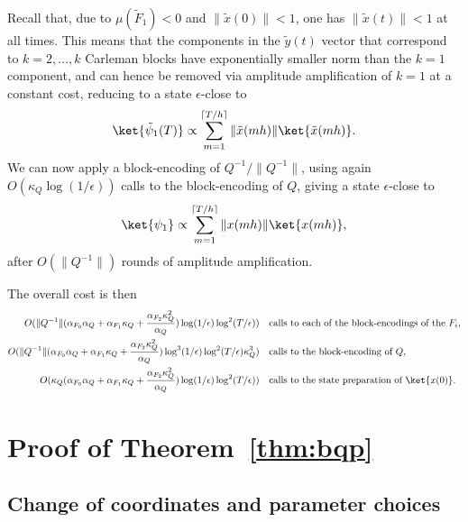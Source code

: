 \documentclass[superscriptaddress,onecolumn,nofootinbib,longbibliography,a4paper,accepted=2026-09-29]{quantumarticle}
\theoremstyle{plain}
\theoremstyle{definition}
\numberwithin{thm}{section}
\numberwithin{assumption}{section}
\numberwithin{lemma}{section}
\numberwithin{prop}{section}
\numberwithin{cor}{section}
\numberwithin{definition}{section}
\numberwithin{rmk}{section}
\numberwithin{equation}{section}
\begin{document}
Recall that, due to $\mu(\tilde{F}_1)<0$ and $\| \tilde{x}(0)\|<1$, one has $\| \tilde{x}(t)\| <1$ at all times.  This means that the components in the $\tilde{y}(t)$ vector that correspond to $k =2, \dots, k$ Carleman blocks have exponentially smaller norm than the $k=1$ component, and can hence be removed via amplitude amplification of $k=1$ at a constant cost, reducing to a state $\epsilon$-close to
\begin{align}
\ket{\tilde{\psi}_1(T)} \propto \sum_{m=1}^{\lceil T/h \rceil} \| \tilde{x}(mh)\| \ket{\tilde{x}(mh)}.
\end{align}
We can now apply a block-encoding of $Q^{-1}/\|Q^{-1}\|$, using again $O(\kappa_Q \log(1/\epsilon))$ calls to the block-encoding of $Q$, giving a state $\epsilon$-close to
\begin{align}
    \ket{\psi_1} \propto \sum_{m=1}^{\lceil T/h \rceil} \| x(mh)\| \ket{x(mh)},
\end{align}
after $O(\|Q^{-1}\|)$ rounds of amplitude amplification. 

The overall cost is then 
\footnotesize
\begin{align}
O(\|Q^{-1}\|(\alpha_{F_0} \alpha_Q + \alpha_{F_1} \kappa_Q + \frac{\alpha_{F_2} \kappa_Q^2}{\alpha_Q})\log(1/\epsilon) \log^2(T/\epsilon)) & \quad \textrm{calls to each of the block-encodings of the } F_i, \nonumber \\
O(\|Q^{-1}\|(\alpha_{F_0} \alpha_Q + \alpha_{F_1} \kappa_Q + \frac{\alpha_{F_2} \kappa_Q^2}{\alpha_Q})\log^3(1/\epsilon) \log^2(T/\epsilon) \kappa^3_Q) & \quad  \textrm{calls to the block-encoding of } Q, \nonumber \\
 O(\kappa_Q (\alpha_{F_0} \alpha_Q + \alpha_{F_1} \kappa_Q + \frac{\alpha_{F_2} \kappa_Q^2}{\alpha_Q})\log(1/\epsilon)\log^2(T/\epsilon)) & \quad \textrm{calls to the state preparation of $\ket{x(0)}$}. 
\end{align}
\normalsize





\section{Proof of Theorem~\ref{thm:bqp}}
\label{sec:proofbqpcompleteness}


\subsection{Change of coordinates and parameter choices}
\end{document}
